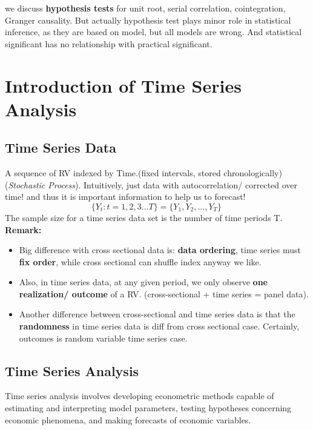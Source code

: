 \documentclass[12pt]{article}
\begin{document}
\noindent
we discuss \textbf{hypothesis tests} for unit root, serial correlation, cointegration, Granger causality. But actually hypothesis test plays minor role in statistical inference, as they are based on model, but all models are wrong. And statistical significant has no relationship with practical significant. 

\newpage
\tableofcontents
\newpage
\setcounter{page}{1}

{\color{RoyalBlue}
\section{Introduction of Time Series Analysis}}

{\color{RoyalBlue}
\subsection{Time Series Data}}
A sequence of RV indexed by Time.(fixed intervals, stored chronologically) (\textit{Stochastic Process}). Intuitively, just data with autocorrelation/ corrected over time! and thus it is important information to help us to forecast!
\begin{equation}
\{ Y_t: t = 1,2,3...T \} = \{Y_1, Y_2, ..., Y_T \} \ 
\end{equation}
The sample size for a time series data set is the number of time periods T.
\\
\noindent
{\color{ForestGreen}\textbf{Remark: }} 
\begin{itemize}
\item 
Big difference with cross sectional data is: \textbf{data ordering}, time series must \textbf{fix order}, while cross sectional can shuffle index anyway we like. 
\item
Also, in time series data, at any given period, we only observe \textbf{ one realization/ outcome} of a RV. (cross-sectional + time series = panel data).
\item
Another difference between cross-sectional and time series data is that the \textbf{randomness} in time series data is diff from cross sectional case. Certainly, outcomes is random variable time series case. 
\end{itemize}

{\color{RoyalBlue}
\subsection{Time Series Analysis}}
Time series analysis involves developing econometric methods capable of estimating and interpreting model parameters, testing hypotheses concerning economic phenomena, and making forecasts of economic variables.
\\
\end{document}

